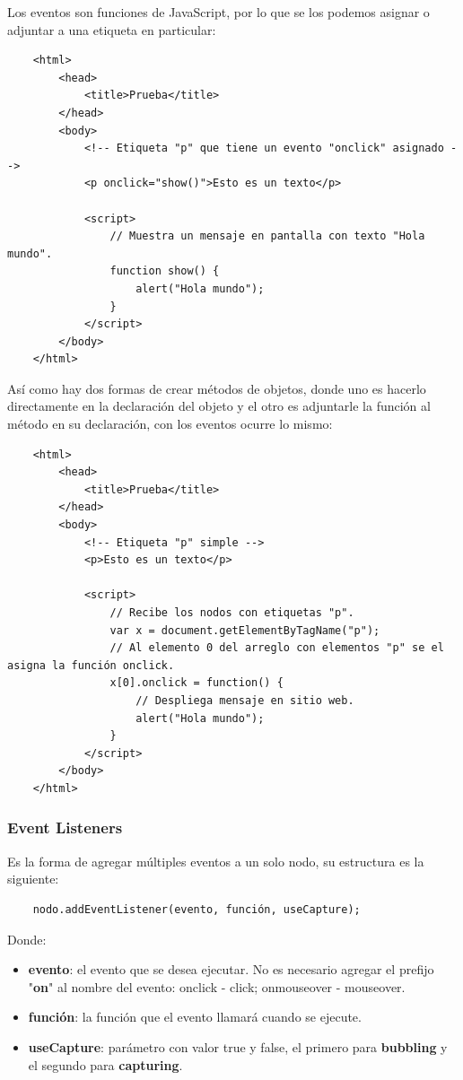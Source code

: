 Los eventos son funciones de JavaScript, por lo que se los podemos asignar o adjuntar a una etiqueta en particular:
\begin{lstlisting}
    <html>
        <head>
            <title>Prueba</title>
        </head>
        <body>
            <!-- Etiqueta "p" que tiene un evento "onclick" asignado -->
            <p onclick="show()">Esto es un texto</p>
            
            <script>
                // Muestra un mensaje en pantalla con texto "Hola mundo".
                function show() {
                    alert("Hola mundo");
                }
            </script>
        </body>
    </html>
\end{lstlisting}

Así como hay dos formas de crear métodos de objetos, donde uno es hacerlo directamente en la declaración del objeto y el otro es adjuntarle la función al método en su declaración, con los eventos ocurre lo mismo:
\begin{lstlisting}
    <html>
        <head>
            <title>Prueba</title>
        </head>
        <body>
            <!-- Etiqueta "p" simple -->
            <p>Esto es un texto</p>
            
            <script>
                // Recibe los nodos con etiquetas "p".
                var x = document.getElementByTagName("p");
                // Al elemento 0 del arreglo con elementos "p" se el asigna la función onclick.
                x[0].onclick = function() {
                    // Despliega mensaje en sitio web.
                    alert("Hola mundo");
                }
            </script>
        </body>
    </html>
\end{lstlisting}


\subsubsection{Event Listeners}

Es la forma de agregar múltiples eventos a un solo nodo, su estructura es la siguiente:
\begin{lstlisting}
    nodo.addEventListener(evento, función, useCapture);
\end{lstlisting}

Donde:
\begin{itemize}
    \item \textbf{evento}: el evento que se desea ejecutar. No es necesario agregar el prefijo "\textbf{on}" al nombre del evento: onclick - click; onmouseover - mouseover.
    \item \textbf{función}: la función que el evento llamará cuando se ejecute.
    \item \textbf{useCapture}: parámetro con valor true y false, el primero para \textbf{bubbling} y el segundo para \textbf{capturing}.
\end{itemize}

